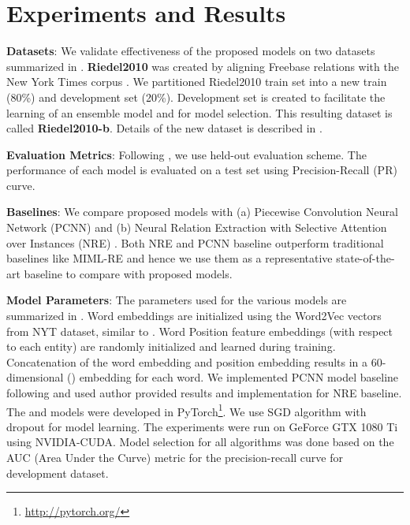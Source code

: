 \documentclass{article}
\begin{document}
\section{Experiments and Results}
\label{sec:expts}


 \textbf{Datasets}: We validate effectiveness of the proposed models on two datasets summarized in . {\bf Riedel2010} was created by aligning Freebase relations with the New York Times corpus \cite{riedel:2010,hoffmann:2011,surdeanu:2012,nre-lin} . We partitioned Riedel2010 train set into a new train (80\%) and development set (20\%). Development set is created to facilitate the learning of an ensemble model and for model selection. This resulting dataset is called {\bf Riedel2010-b}. Details of the new {\bf \newdatasetshort{}} dataset is described in . 

\textbf{Evaluation Metrics}: Following \cite{nre-lin}, we use held-out evaluation scheme. The performance of each model is evaluated on a test set using Precision-Recall (PR) curve. 

\textbf{Baselines}: We compare proposed models with (a) Piecewise Convolution Neural Network (PCNN) \cite{zeng:2015} and (b) Neural Relation Extraction with Selective Attention over Instances (NRE) \cite{nre-lin}. Both NRE and PCNN baseline outperform traditional baselines like MIML-RE and hence we use them as a representative state-of-the-art baseline to compare with proposed models.

\textbf{Model Parameters}: The parameters used for the various models are summarized in . Word embeddings are initialized using the Word2Vec vectors from NYT dataset, similar to \cite{nre-lin}. Word Position feature embeddings (with respect to each entity) are randomly initialized and learned during training. Concatenation of the word embedding and position embedding results in a 60-dimensional () embedding  for each word.  We implemented PCNN model baseline following \cite{zeng:2015} and used author provided results and implementation for NRE baseline. The \systemea{} and \systemwa{} models were developed in PyTorch\footnote{\url{http://pytorch.org/}}. We use SGD algorithm with dropout \cite{srivastava2014dropout} for model learning. The experiments were run on GeForce GTX 1080 Ti using NVIDIA-CUDA. Model selection for all algorithms was done based on the AUC (Area Under the Curve) metric for the precision-recall curve for development dataset. 
\end{document}
